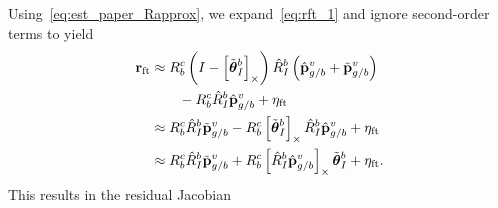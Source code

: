 Using~\eqref{eq:est_paper_Rapprox}, we expand~\eqref{eq:rft_1} and ignore
second-order terms to yield
\begin{align}
   \boldsymbol{\mathrm{r}}_{\text{ft}} &\approx R_b^c \left( I -
   \left[ \tilde{\boldsymbol{\mathrm{\theta}}}_I^b  \right]_{\times}\right) \hat{R}_I^b \left(
 \hat{\boldsymbol{\mathrm{p}}}_{g/b}^v + \tilde{\boldsymbol{\mathrm{p}}}_{g/b}^v \right) \\
                        & \qquad - R_b^c \hat{R}_I^b \hat{\boldsymbol{\mathrm{p}}}_{g/b}^v +
                          \eta_{\text{ft}} \nonumber \\
  &\approx R_b^c \hat{R}_I^b \tilde{\boldsymbol{\mathrm{p}}}_{g/b}^v -
  R_b^c \left[ \tilde{\boldsymbol{\mathrm{\theta}}}_I^b  \right]_{\times} \hat{R}_I^b \hat{\boldsymbol{\mathrm{p}}}_{g/b}^v 
      + \eta_{\text{ft}} \\
&\approx R_b^c \hat{R}_I^b \tilde{\boldsymbol{\mathrm{p}}}_{g/b}^v + R_b^c \left[ \hat{R}_I^b \hat{\boldsymbol{\mathrm{p}}}_{g/b}^v \right]_{\times} \tilde{\boldsymbol{\mathrm{\theta}}}_I^b 
      + \eta_{\text{ft}}.
\end{align}
This results in the residual Jacobian
